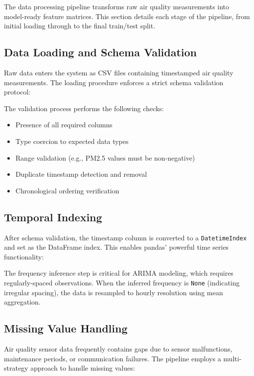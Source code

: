 The data processing pipeline transforms raw air quality measurements into model-ready feature matrices. This section details each stage of the pipeline, from initial loading through to the final train/test split.

\subsection{Data Loading and Schema Validation}

Raw data enters the system as CSV files containing timestamped air quality measurements. The loading procedure enforces a strict schema validation protocol:


The validation process performs the following checks:
\begin{itemize}
    \item Presence of all required columns
    \item Type coercion to expected data types
    \item Range validation (e.g., PM2.5 values must be non-negative)
    \item Duplicate timestamp detection and removal
    \item Chronological ordering verification
\end{itemize}

\subsection{Temporal Indexing}

After schema validation, the timestamp column is converted to a \texttt{DatetimeIndex} and set as the DataFrame index. This enables pandas' powerful time series functionality:


The frequency inference step is critical for ARIMA modeling, which requires regularly-spaced observations. When the inferred frequency is \texttt{None} (indicating irregular spacing), the data is resampled to hourly resolution using mean aggregation.

\subsection{Missing Value Handling}

Air quality sensor data frequently contains gaps due to sensor malfunctions, maintenance periods, or communication failures. The pipeline employs a multi-strategy approach to handle missing values:

